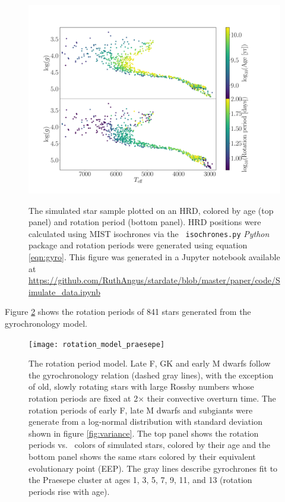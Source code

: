 \begin{figure}
  \caption{
      The simulated star sample plotted on an HRD, colored by age
    (top panel) and rotation period (bottom panel).
    HRD positions were calculated using MIST isochrones via the {\tt
    isochrones.py} {\it Python} package and rotation periods were generated
    using equation \ref{eqn:gyro}.
    This figure was generated in a Jupyter notebook available at
    \url{https://github.com/RuthAngus/stardate/blob/master/paper/code/Simulate_data.ipynb}
}
  \centering
    \includegraphics[width=1\textwidth]{simulated_CMD}
\label{fig:CMD_age}
\end{figure}
Figure \ref{fig:rotation_model} shows the rotation periods of 841
stars generated from the gyrochronology model.
\begin{figure}
  \caption{
The rotation period model.
Late F, GK and early M dwarfs follow the \citet{angus2015} gyrochronology
    relation (dashed gray lines), with the exception of old, slowly
    rotating stars with large Rossby numbers whose rotation periods are fixed
    at 2$\times$ their convective overturn time.
The rotation periods of early F, late M dwarfs and subgiants were generate
    from a log-normal distribution with standard deviation shown in figure
    \ref{fig:variance}.
The top panel shows the rotation periods vs. \gcolor\ colors of simulated stars,
    colored by their age and the bottom panel shows the same stars colored
    by their equivalent evolutionary point (EEP).
    The gray lines describe gyrochrones fit to the Praesepe cluster at ages 1,
    3, 5, 7, 9, 11, and 13 (rotation periods rise with age).
}
  \centering
    \texttt{[image: rotation\_model\_praesepe]}
\label{fig:rotation_model}
\end{figure}


